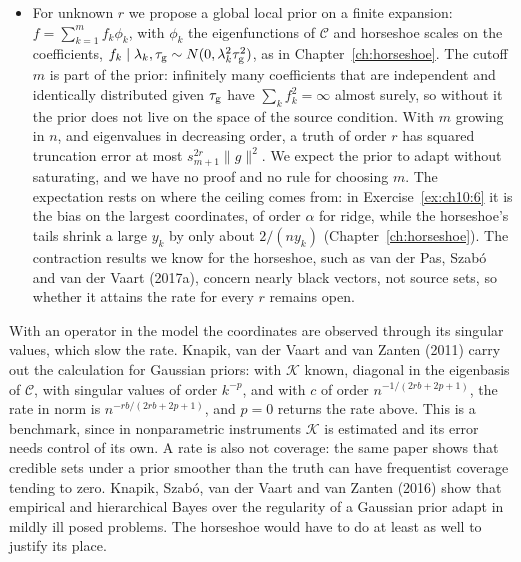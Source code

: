 \begin{itemize}
\item For unknown $r$ we propose a global local prior on a finite expansion: $f = \sum_{k=1}^m f_k\phi_k$, with $\phi_k$ the eigenfunctions of $\mathcal{C}$ and horseshoe scales on the coefficients, $f_k \mid \lambda_k, \tau_{\mathrm{g}} \sim N(0, \lambda_k^2\tau_{\mathrm{g}}^2)$, as in Chapter~\ref{ch:horseshoe}. The cutoff $m$ is part of the prior: infinitely many coefficients that are independent and identically distributed given $\tau_{\mathrm{g}}$ have $\sum_k f_k^2 = \infty$ almost surely, so without it the prior does not live on the space of the source condition. With $m$ growing in $n$, and eigenvalues in decreasing order, a truth of order $r$ has squared truncation error at most $s_{m+1}^{2r}\|g\|^2$. We expect the prior to adapt without saturating, and we have no proof and no rule for choosing $m$. The expectation rests on where the ceiling comes from: in Exercise~\ref{ex:ch10:6} it is the bias on the largest coordinates, of order $\alpha$ for ridge, while the horseshoe's tails shrink a large $y_k$ by only about $2/(ny_k)$ (Chapter~\ref{ch:horseshoe}). The contraction results we know for the horseshoe, such as van der Pas, Szab\'o and van der Vaart (2017a), concern nearly black vectors, not source sets, so whether it attains the rate for every $r$ remains open.
\end{itemize}
With an operator in the model the coordinates are observed through its singular values, which slow the rate. Knapik, van der Vaart and van Zanten (2011) carry out the calculation for Gaussian priors: with $\mathcal{K}$ known, diagonal in the eigenbasis of $\mathcal{C}$, with singular values of order $k^{-p}$, and with $c$ of order $n^{-1/(2rb+2p+1)}$, the rate in norm is $n^{-rb/(2rb+2p+1)}$, and $p = 0$ returns the rate above. This is a benchmark, since in nonparametric instruments $\mathcal{K}$ is estimated and its error needs control of its own. A rate is also not coverage: the same paper shows that credible sets under a prior smoother than the truth can have frequentist coverage tending to zero. Knapik, Szab\'o, van der Vaart and van Zanten (2016) show that empirical and hierarchical Bayes over the regularity of a Gaussian prior adapt in mildly ill posed problems. The horseshoe would have to do at least as well to justify its place.

